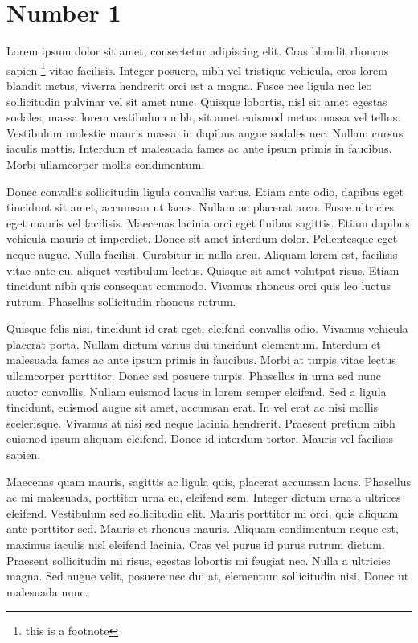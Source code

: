 \documentclass{tufte-handout}
\begin{document}
\section{Number 1}\label{number-1}

Lorem ipsum dolor sit amet, consectetur adipiscing elit. Cras blandit
rhoncus sapien \footnote{this is a footnote} vitae facilisis. Integer
posuere, nibh vel tristique vehicula, eros lorem blandit metus, viverra
hendrerit orci est a magna. Fusce nec ligula nec leo sollicitudin
pulvinar vel sit amet nunc. Quisque lobortis, nisl sit amet egestas
sodales, massa lorem vestibulum nibh, sit amet euismod metus massa vel
tellus. Vestibulum molestie mauris massa, in dapibus augue sodales nec.
Nullam cursus iaculis mattis. Interdum et malesuada fames ac ante ipsum
primis in faucibus. Morbi ullamcorper mollis condimentum.

Donec convallis sollicitudin ligula convallis varius. Etiam ante odio,
dapibus eget tincidunt sit amet, accumsan ut lacus. Nullam ac placerat
arcu. Fusce ultricies eget mauris vel facilisis. Maecenas lacinia orci
eget finibus sagittis. Etiam dapibus \cite{Lande1979} vehicula
mauris et imperdiet. Donec sit amet interdum dolor. Pellentesque eget
neque augue. Nulla facilisi. Curabitur in nulla arcu. Aliquam lorem est,
facilisis vitae ante eu, aliquet vestibulum lectus. Quisque sit amet
volutpat risus. Etiam tincidunt nibh quis consequat commodo. Vivamus
rhoncus orci quis leo luctus rutrum. Phasellus sollicitudin rhoncus
rutrum.

Quisque felis nisi, tincidunt id erat eget, eleifend convallis odio.
Vivamus vehicula placerat porta. Nullam dictum varius dui tincidunt
elementum. Interdum et malesuada fames ac ante ipsum primis in faucibus.
Morbi at turpis vitae lectus ullamcorper porttitor. Donec sed posuere
turpis. Phasellus in urna sed nunc auctor convallis. Nullam euismod
lacus in lorem semper eleifend. Sed a ligula tincidunt, euismod augue
sit amet, accumsan erat. In vel erat ac nisi mollis scelerisque. Vivamus
at nisi sed neque lacinia hendrerit. Praesent pretium nibh euismod ipsum
aliquam eleifend. Donec id interdum tortor. Mauris vel facilisis sapien.

Maecenas quam mauris, sagittis ac ligula quis, placerat accumsan lacus.
Phasellus ac mi malesuada, porttitor urna eu, eleifend sem. Integer
dictum urna a ultrices eleifend. Vestibulum sed sollicitudin elit.
Mauris porttitor mi orci, quis aliquam ante porttitor sed. Mauris et
rhoncus mauris. Aliquam condimentum neque est, maximus iaculis nisl
eleifend lacinia. Cras vel purus id purus rutrum dictum. Praesent
sollicitudin mi risus, egestas lobortis mi feugiat nec. Nulla a
ultricies magna. Sed augue velit, posuere nec dui at, elementum
sollicitudin nisi. Donec ut malesuada nunc.
\end{document}
